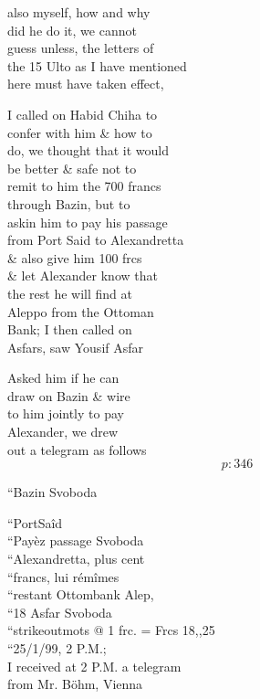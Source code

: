 \documentclass{report}
\begin{document}


	\par{
 	also myself, how and why\ \\did he do it, we cannot\ \\guess unless, the letters of\ \\the 15 Ulto as I have mentioned\ \\here must have taken effect,\ \\
	}

	\par{
 	I called on Habid Chiha to\ \\confer with him \& how to\ \\do, we thought that it would\ \\be better \& safe not to\ \\remit to him the 700 francs\ \\through Bazin, but to\ \\askin him to pay his passage\ \\from Port Said to Alexandretta\ \\\& also give him 100 frcs\ \\\& let Alexander know that\ \\the rest he will find at\ \\Aleppo from the Ottoman\ \\Bank; I then called on\ \\Asfars, saw Yousif Asfar\ \\
	}

	\par{
 	Asked him if he can\ \\draw on Bazin \& wire\ \\to him jointly to pay\ \\Alexander, we drew\ \\out a telegram as follows\ \\
  \[p: 346 \]

	}

	\par{
 	“Bazin Svoboda\ \\
	}

	\par{
 	“PortSaîd\ \\“Payèz passage Svoboda\ \\“Alexandretta, plus cent\ \\“francs, lui rémîmes\ \\“restant Ottombank Alep,\ \\“18 Asfar Svoboda\ \\“\lbrack strikeout\rbrack mots @ 1 frc. = Frcs 18,,25\ \\“25/1/99, 2 P.M.;\ \\I received at 2 P.M. a telegram\ \\from Mr. Böhm, Vienna\ \\
	}
\end{document}
